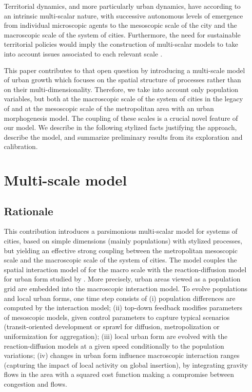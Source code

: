 \documentclass[11pt]{article}
\begin{document}
Territorial dynamics, and more particularly urban dynamics, have according to \cite{pumain1997pour} an intrinsic multi-scalar nature, with successive autonomous levels of emergence from individual microscopic agents to the mesoscopic scale of the city and the macroscopic scale of the system of cities. Furthermore, the need for sustainable territorial policies would imply the construction of multi-scalar models to take into account issues associated to each relevant scale \cite{Rozenblat2018}.

This paper contributes to that open question by introducing a multi-scale model of urban growth which focuses on the spatial structure of processes rather than on their multi-dimensionality. Therefore, we take into account only population variables, but both at the macroscopic scale of the system of cities in the legacy of \cite{pumain2017urban} and at the mesoscopic scale of the metropolitan area with an urban morphogenesis model. The coupling of these scales is a crucial novel feature of our model. We describe in the following stylized facts justifying the approach, describe the model, and summarize preliminary results from its exploration and calibration.



\section{Multi-scale model}

\subsection{Rationale}

This contribution introduces a parsimonious multi-scalar model for systems of cities, based on simple dimensions (mainly populations) with stylized processes, but yielding an effective strong coupling between the metropolitan mesoscopic scale and the macroscopic scale of the system of cities. The model couples the spatial interaction model of \cite{raimbault2018indirect} for the macro scale with the reaction-diffusion model for urban form studied by \cite{raimbault2018calibration}. More precisely, urban areas viewed as a population grid are embedded into the macroscopic interaction model. To evolve populations and local urban forms, one time step consists of (i) population differences are computed by the interaction model; (ii) top-down feedback modifies parameters of mesoscopic models, given control parameters to capture typical scenarios (transit-oriented development or sprawl for diffusion, metropolization or uniformization for aggregation); (iii) local urban form are evolved with the reaction-diffusion models at a given speed conditionally to the population variations; (iv) changes in urban form influence macroscopic interaction ranges (capturing the impact of local activity on global insertion), by integrating gravity flows in the area with a squared cost function making a compromise between congestion and flows.
\end{document}
